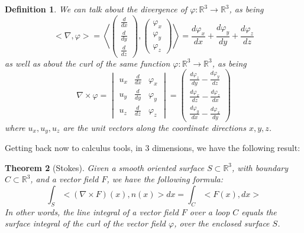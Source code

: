 \documentclass[12pt]{amsbook}
\newtheorem{theorem}{Theorem}[chapter]
\newtheorem{definition}[theorem]{Definition}
\begin{document}
\begin{definition}
We can talk about the divergence of $\varphi:\mathbb R^3\to\mathbb R^3$, as being
$$<\nabla,\varphi>=
\left<\begin{pmatrix}
\frac{d}{dx}\\
\frac{d}{dy}\\
\frac{d}{dz}
\end{pmatrix},\begin{pmatrix}
\varphi_x\\
\varphi_y\\
\varphi_z
\end{pmatrix}\right>=
\frac{d\varphi_x}{dx}+\frac{d\varphi_y}{dy}+\frac{d\varphi_z}{dz}$$
as well as about the curl of the same function $\varphi:\mathbb R^3\to\mathbb R^3$, as being
$$\nabla\times\varphi=
\begin{vmatrix}
u_x&\frac{d}{dx}&\varphi_x\\
u_y&\frac{d}{dy}&\varphi_y\\
u_z&\frac{d}{dz}&\varphi_z
\end{vmatrix}
=\begin{pmatrix}
\frac{d\varphi_z}{dy}-\frac{d\varphi_y}{dz}\\
\frac{d\varphi_x}{dz}-\frac{d\varphi_z}{dx}\\
\frac{d\varphi_y}{dx}-\frac{d\varphi_x}{dy}
\end{pmatrix}
$$
where $u_x,u_y,u_z$ are the unit vectors along the coordinate directions $x,y,z$.
\end{definition}

Getting back now to calculus tools, in 3 dimensions, we have the following result:

\begin{theorem}[Stokes]
Given a smooth oriented surface $S\subset\mathbb R^3$, with boundary $C\subset\mathbb R^3$, and a vector field $F$, we have the following formula:
$$\int_S<(\nabla\times F)(x),n(x)>dx=\int_C<F(x),dx>$$
In other words, the line integral of a vector field $F$ over a loop $C$ equals the surface integral of the curl of the vector field $\varphi$, over the enclosed surface $S$. 
\end{theorem}
\end{document}
